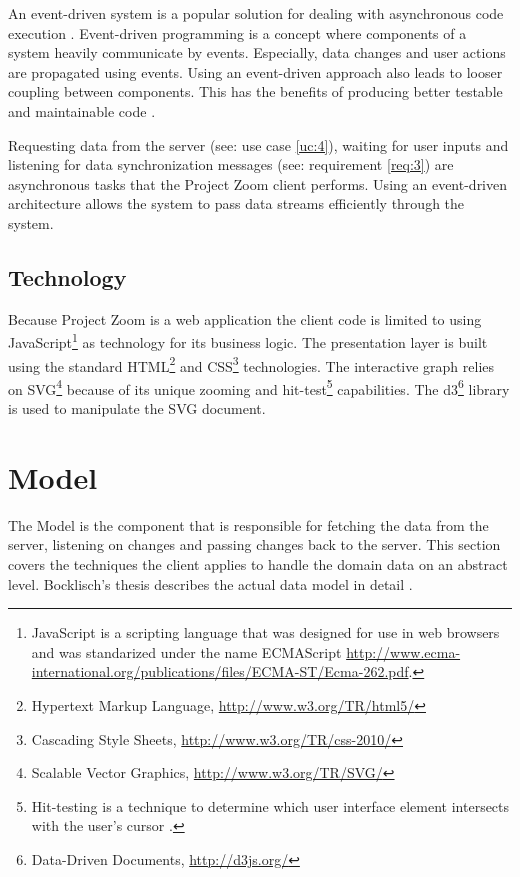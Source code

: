 An event-driven system is a popular solution for dealing with asynchronous code execution \cite{Michelson_2006}. Event-driven programming is a concept where components of a system heavily communicate by events. Especially, data changes and user actions are propagated using events. Using an event-driven approach also leads to looser coupling between components. This has the benefits of producing better testable and maintainable code \cite{Faison_2011}. 

Requesting data from the server (see: use case \ref{uc:4}), waiting for user inputs and listening for data synchronization messages (see: requirement \ref{req:3}) are asynchronous tasks that the Project Zoom client performs. Using an event-driven architecture allows the system to pass data streams efficiently through the system.


\subsection{Technology}
Because Project Zoom is a web application the client code is limited to using JavaScript\footnote{JavaScript is a scripting language that was designed for use in web browsers and was standarized under the name ECMAScript \url{http://www.ecma-international.org/publications/files/ECMA-ST/Ecma-262.pdf}.} as technology for its business logic. The presentation layer is built using the standard HTML\footnote{Hypertext Markup Language, \url{http://www.w3.org/TR/html5/}} and CSS\footnote{Cascading Style Sheets, \url{http://www.w3.org/TR/css-2010/}} technologies. The interactive graph relies on SVG\footnote{Scalable Vector Graphics, \url{http://www.w3.org/TR/SVG/}} because of its unique zooming and hit-test\footnote{Hit-testing is a technique to determine which user interface element intersects with the user's cursor \cite{Foley_1995}.} capabilities. The d3\footnote{Data-Driven Documents, \url{http://d3js.org/}} library is used to manipulate the SVG document.

\section{Model}

The Model is the component that is responsible for fetching the data from the server, listening on changes and passing changes back to the server. This section covers the techniques the client applies to handle the domain data on an abstract level. Bocklisch's thesis describes the actual data model in detail \cite{Bocklisch_2013}.

